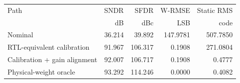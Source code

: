 \small
\begin{tabularx}{\linewidth}{@{}>{\raggedright\arraybackslash}Xrrrr@{}}
\toprule
Path & SNDR & SFDR & W-RMSE & Static RMS \\
 & dB & dBc & LSB & code \\
\midrule
Nominal & 36.214 & 39.892 & 147.9781 & 507.7850 \\
RTL-equivalent calibration & 91.967 & 106.317 & 0.1908 & 271.0804 \\
Calibration + gain alignment & 92.007 & 106.717 & 0.1908 & 0.4777 \\
Physical-weight oracle & 93.292 & 114.246 & 0.0000 & 0.4082 \\
\bottomrule
\end{tabularx}
